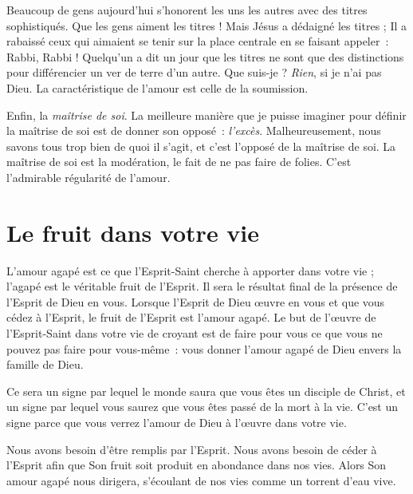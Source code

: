 Beaucoup de gens aujourd'hui s'honorent les uns les autres
 avec des titres sophistiqués. Que les gens aiment les titres !
 Mais Jésus a dédaigné les titres ; Il a rabaissé ceux qui aimaient
 se tenir sur la place centrale en se faisant appeler~:
 \og Rabbi, Rabbi ! \fg{}
 Quelqu'un a dit un jour que les titres ne sont que des distinctions
 pour différencier un ver de terre d'un autre. Que suis-je ?
 \emph{Rien}, si je n'ai pas Dieu. La caractéristique de l'amour
 est celle de la soumission.

Enfin, la \emph{maîtrise de soi}. La meilleure manière que je puisse imaginer
 pour définir la maîtrise de soi est de donner son opposé~: \emph{l'excès}.
 Malheureusement, nous savons tous trop bien de quoi il s'agit,
 et c'est l'opposé de la maîtrise de soi.
 La maîtrise de soi est la modération, le fait de ne pas faire de folies.
 C'est l'admirable régularité de l'amour.


\section{Le fruit dans votre vie}

L'amour agapé est ce que l'Esprit-Saint cherche à apporter dans votre vie ;
 l'agapé est le véritable fruit de l'Esprit.
 Il sera le résultat final de la présence de l'Esprit de Dieu en vous.
 Lorsque l'Esprit de Dieu œuvre en vous et que vous cédez à l'Esprit,
 le fruit de l'Esprit est l'amour agapé. Le but de l'œuvre de
 l'Esprit-Saint dans votre vie de croyant est de faire pour vous
 ce que vous ne pouvez pas faire pour vous-même~:
 vous donner l'amour agapé de Dieu envers la famille de Dieu.

Ce sera un signe par lequel le monde saura que vous êtes un disciple
 de Christ, et un signe par lequel vous saurez que vous êtes passé
 de la mort à la vie. C'est un signe parce que vous verrez
 l'amour de Dieu à l'œuvre dans votre vie.

Nous avons besoin d'être remplis par l'Esprit.
 Nous avons besoin de céder à l'Esprit afin que Son fruit soit produit
 en abondance dans nos vies. Alors Son amour agapé nous dirigera,
 s'écoulant de nos vies comme un torrent d'eau vive.
\closechapter

